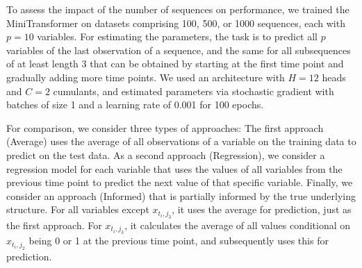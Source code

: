 \documentclass[AMA,Times1COL]{WileyNJDv5} %
\begin{document}
To assess the impact of the number of sequences on performance, we trained the MiniTransformer on datasets comprising 100, 500, or 1000 sequences, each with $p=10$ variables. For estimating the parameters, the task is to predict all $p$ variables of the last observation of a sequence, and the same for all subsequences of at least length 3 that can be obtained by starting at the first time point and gradually adding more time points. We used an architecture with $H = 12$ heads and $C=2$ cumulants, and estimated parameters via stochastic gradient with batches of size 1 and a learning rate of 0.001 for 100 epochs.

For comparison, we consider three types of approaches: The first approach (Average) uses the average of all observations of a variable on the training data to predict on the test data. As a second approach (Regression), we consider a regression model for each variable that uses the values of all variables from the previous time point to predict the next value of that specific variable. Finally, we consider an approach  (Informed) that is partially informed by the true underlying structure. For all variables except $x_{t_i,j_3}$, it uses the average for prediction, just as the first approach. For $x_{t_i,j_3}$, it calculates the average of all values conditional on $x_{t_i,j_2}$ being 0 or 1 at the previous time point, and subsequently uses this for prediction.
\end{document}
